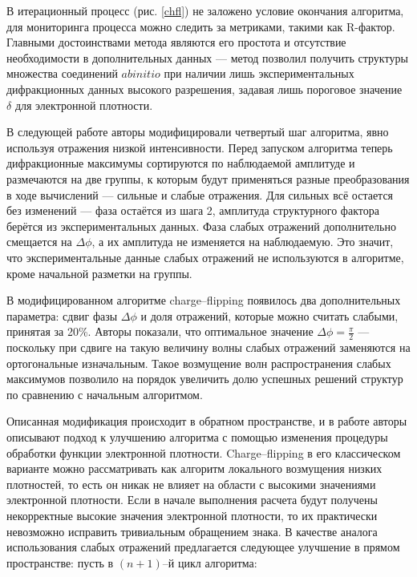 В итерационный процесс (рис. \ref{chfl}) не заложено условие окончания алгоритма, для мониторинга процесса можно следить за метриками, такими как R-фактор. Главными достоинствами метода являются его простота и отсутствие необходимости в дополнительных данных --- метод позволил получить структуры множества соединений $ab initio$ при наличии лишь экспериментальных дифракционных данных высокого разрешения, задавая лишь пороговое значение $\delta$ для электронной плотности.

В следующей работе \cite{oszlanyi_it_2005} авторы модифицировали четвертый шаг алгоритма, явно используя отражения низкой интенсивности. Перед запуском алгоритма теперь дифракционные максимумы сортируются по наблюдаемой амплитуде и размечаются на две группы, к которым будут применяться разные преобразования в ходе вычислений --- сильные и слабые отражения. Для сильных всё остается без изменений --- фаза остаётся из шага 2, амплитуда структурного фактора берётся из экспериментальных данных. Фаза слабых отражений дополнительно смещается на $\Delta\phi$, а их амплитуда не изменяется на наблюдаемую. Это значит, что экспериментальные данные слабых отражений не используются в алгоритме, кроме начальной разметки на группы.

В модифицированном алгоритме charge--flipping появилось два дополнительных параметра: сдвиг фазы $\Delta\phi$ и доля отражений, которые можно считать слабыми, принятая за 20\%. Авторы показали, что оптимальное значение $\Delta\phi = \frac{\pi}{2}$ --- поскольку при сдвиге на такую величину волны слабых отражений заменяются на ортогональные изначальным. Такое возмущение волн распространения слабых максимумов позволило на порядок увеличить долю успешных решений структур по сравнению с начальным алгоритмом.

Описанная модификация происходит в обратном пространстве, и в работе \cite{oszlanyi_charge_2008} авторы описывают подход к улучшению алгоритма с помощью изменения процедуры обработки функции электронной плотности. Charge--flipping в его классическом варианте можно рассматривать как алгоритм локального возмущения низких плотностей, то есть он никак не влияет на области с высокими значениями электронной плотности. Если в начале выполнения расчета будут получены некорректные высокие значения электронной плотности, то их практически невозможно исправить тривиальным обращением знака. В качестве аналога использования слабых отражений предлагается следующее улучшение в прямом пространстве: пусть в $(n+1)$--й цикл алгоритма:


